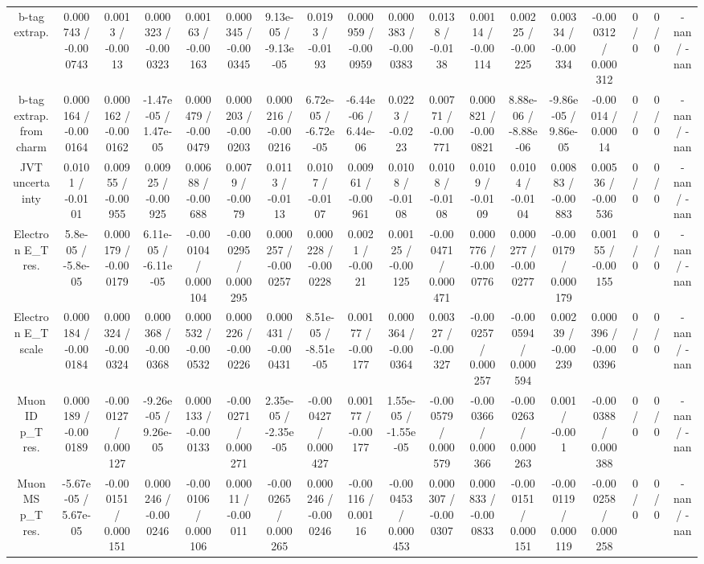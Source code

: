 \documentclass[10pt]{article}
\begin{document}
\begin{table}[htbp]
\begin{center}
\begin{tabular}{|c|c|c|c|c|c|c|c|c|c|c|c|c|c|c|c|c|c|}
  b-tag extrap. & 0.000743 / -0.000743 & 0.0013 / -0.0013 & 0.000323 / -0.000323 & 0.00163 / -0.00163 & 0.000345 / -0.000345 & 9.13e-05 / -9.13e-05 & 0.0193 / -0.0193 & 0.000959 / -0.000959 & 0.000383 / -0.000383 & 0.0138 / -0.0138 & 0.00114 / -0.00114 & 0.00225 / -0.00225 & 0.00334 / -0.00334 & -0.000312 / 0.000312 & 0 / 0 & 0 / 0 & -nan / -nan \\ 
  b-tag extrap. from charm & 0.000164 / -0.000164 & 0.000162 / -0.000162 & -1.47e-05 / 1.47e-05 & 0.000479 / -0.000479 & 0.000203 / -0.000203 & 0.000216 / -0.000216 & 6.72e-05 / -6.72e-05 & -6.44e-06 / 6.44e-06 & 0.0223 / -0.0223 & 0.00771 / -0.00771 & 0.000821 / -0.000821 & 8.88e-06 / -8.88e-06 & -9.86e-05 / 9.86e-05 & -0.00014 / 0.00014 & 0 / 0 & 0 / 0 & -nan / -nan \\ 
  JVT uncertainty & 0.0101 / -0.0101 & 0.00955 / -0.00955 & 0.00925 / -0.00925 & 0.00688 / -0.00688 & 0.0079 / -0.0079 & 0.0113 / -0.0113 & 0.0107 / -0.0107 & 0.00961 / -0.00961 & 0.0108 / -0.0108 & 0.0108 / -0.0108 & 0.0109 / -0.0109 & 0.0104 / -0.0104 & 0.00883 / -0.00883 & 0.00536 / -0.00536 & 0 / 0 & 0 / 0 & -nan / -nan \\ 
  Electron E_{T} res. & 5.8e-05 / -5.8e-05 & 0.000179 / -0.000179 & 6.11e-05 / -6.11e-05 & -0.000104 / 0.000104 & -0.000295 / 0.000295 & 0.000257 / -0.000257 & 0.000228 / -0.000228 & 0.0021 / -0.0021 & 0.00125 / -0.00125 & -0.000471 / 0.000471 & 0.000776 / -0.000776 & 0.000277 / -0.000277 & -0.000179 / 0.000179 & 0.00155 / -0.00155 & 0 / 0 & 0 / 0 & -nan / -nan \\ 
  Electron E_{T} scale & 0.000184 / -0.000184 & 0.000324 / -0.000324 & 0.000368 / -0.000368 & 0.000532 / -0.000532 & 0.000226 / -0.000226 & 0.000431 / -0.000431 & 8.51e-05 / -8.51e-05 & 0.00177 / -0.00177 & 0.000364 / -0.000364 & 0.00327 / -0.00327 & -0.000257 / 0.000257 & -0.000594 / 0.000594 & 0.00239 / -0.00239 & 0.000396 / -0.000396 & 0 / 0 & 0 / 0 & -nan / -nan \\ 
  Muon ID p_{T} res. & 0.000189 / -0.000189 & -0.000127 / 0.000127 & -9.26e-05 / 9.26e-05 & 0.000133 / -0.000133 & -0.000271 / 0.000271 & 2.35e-05 / -2.35e-05 & -0.000427 / 0.000427 & 0.00177 / -0.00177 & 1.55e-05 / -1.55e-05 & -0.000579 / 0.000579 & -0.000366 / 0.000366 & -0.000263 / 0.000263 & 0.001 / -0.001 & -0.000388 / 0.000388 & 0 / 0 & 0 / 0 & -nan / -nan \\ 
  Muon MS p_{T} res. & -5.67e-05 / 5.67e-05 & -0.000151 / 0.000151 & 0.000246 / -0.000246 & -0.000106 / 0.000106 & 0.00011 / -0.00011 & -0.000265 / 0.000265 & 0.000246 / -0.000246 & -0.00116 / 0.00116 & -0.000453 / 0.000453 & 0.000307 / -0.000307 & 0.000833 / -0.000833 & -0.000151 / 0.000151 & -0.000119 / 0.000119 & -0.000258 / 0.000258 & 0 / 0 & 0 / 0 & -nan / -nan \\ 

\end{tabular}
\end{center}
\end{table}
\end{document}
